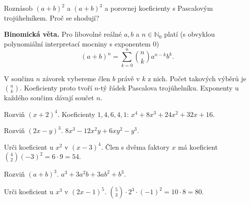\documentclass[11pt,a4paper]{article}
\begin{document}

Roznásob $(a+b)^2$ a $(a+b)^3$ a porovnej koeficienty s Pascalovým trojúhelníkem. Proč se shodují?



\begin{definiceBox}
\textbf{Binomická věta.} Pro libovolné reálné $a,b$ a $n\in\mathbb N_0$ platí (s obvyklou polynomiální interpretací mocniny s exponentem 0)
\[
(a+b)^n=\sum_{k=0}^{n}\binom nk a^{n-k}b^k.
\]
\end{definiceBox}
V součinu $n$ závorek vybereme člen $b$ právě v $k$ z nich. Počet takových výběrů je $\binom nk$. Koeficienty proto tvoří $n$-tý řádek Pascalova trojúhelníku. Exponenty u každého součinu dávají součet $n$.


\begin{prikladReseniBox}[title={Příklad 1}]
Rozviň $(x+2)^4$.
\tcblower
Koeficienty $1,4,6,4,1$: $x^4+8x^3+24x^2+32x+16$.
\end{prikladReseniBox}



\begin{prikladReseniBox}[title={Příklad 2}]
Rozviň $(2x-y)^3$.
\tcblower
$8x^3-12x^2y+6xy^2-y^3$.
\end{prikladReseniBox}



\begin{prikladReseniBox}[title={Příklad 3}]
Urči koeficient u $x^2$ v $(x-3)^4$.
\tcblower
Člen s dvěma faktory $x$ má koeficient $\binom42(-3)^2=6\cdot9=54$.
\end{prikladReseniBox}




\begin{zadaniReseniBox}[title={Samostatná práce 1}]
Rozviň $(a+b)^3$.
\tcblower
$a^3+3a^2b+3ab^2+b^3$.
\end{zadaniReseniBox}



\begin{zadaniReseniBox}[title={Samostatná práce 2}]
Urči koeficient u $x^3$ v $(2x-1)^5$.
\tcblower
$\binom53\cdot 2^3\cdot(-1)^2=10\cdot8=80$.
\end{zadaniReseniBox}
\end{document}
